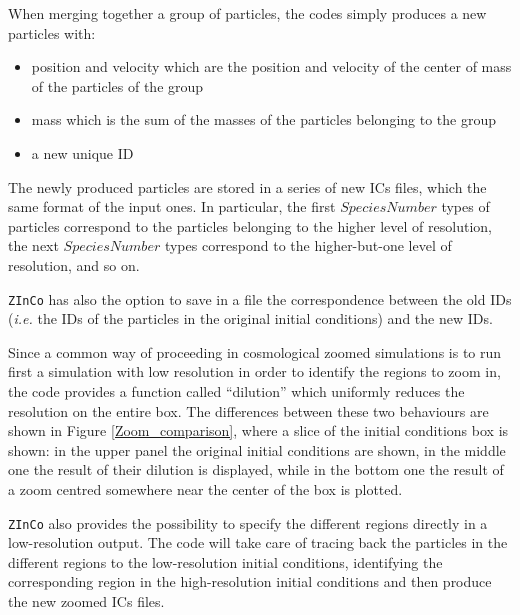 \documentclass[11pt,a4paper,titlepage]{article}
\newcommand{\virg}[1]{``{#1}''}
\newcommand{\ie}{\emph{i.e.}\xspace}
\newcommand{\zinco}{\texttt{ZInCo}\xspace}
\begin{document}
When merging together a group of particles, the codes simply produces a new particles with:
\begin{itemize}
\item position and velocity which are the position and velocity of the center of mass of the particles of the group
\item mass which is the sum of the masses of the particles belonging to the group
\item a new unique ID
\end{itemize}

The newly produced particles are stored in a series of new ICs files, which the same format of the input ones. In particular, the first $SpeciesNumber$ types of particles correspond to the particles belonging to the higher level of resolution, the next $SpeciesNumber$ types correspond to the higher-but-one level of resolution, and so on.

\zinco has also the option to save in a file the correspondence between the old IDs (\ie the IDs of the particles in the original initial conditions) and the new IDs.

Since a common way of proceeding in cosmological zoomed simulations is to run first a simulation with low resolution in order to identify the regions to zoom in, the code provides a function called \virg{dilution} which uniformly reduces the resolution on the entire box. The differences between these two behaviours are shown in Figure \ref{Zoom_comparison}, where a slice of the initial conditions  box is shown: in the upper panel the original initial conditions are shown, in the middle one the result of their dilution is displayed, while in the bottom one the result of a zoom centred somewhere near the center of the box is plotted.

\zinco also provides the possibility to specify the different regions directly in a low-resolution output. The code will take care of tracing back the particles in the different regions to the low-resolution initial conditions, identifying the corresponding region in the high-resolution initial conditions and then produce the new zoomed ICs files.
\end{document}
